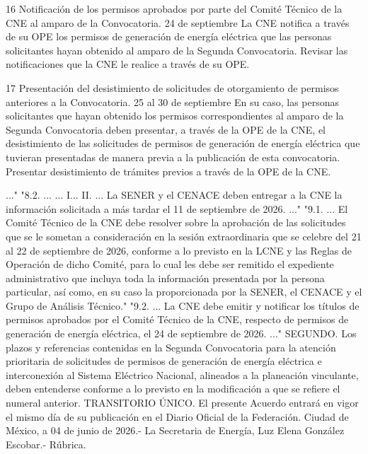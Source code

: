  16
 Notificación de los permisos aprobados por parte del Comité Técnico de la CNE al amparo de la Convocatoria.
 24 de septiembre
 La CNE notifica a través de su OPE los permisos de generación de energía eléctrica que las personas solicitantes hayan obtenido al amparo de la Segunda Convocatoria.
 Revisar las notificaciones que la CNE le realice a través de su OPE.
 
 17
 Presentación del desistimiento de solicitudes de otorgamiento de permisos anteriores a la Convocatoria.
 25 al 30 de septiembre
 En su caso, las personas solicitantes que hayan obtenido los permisos correspondientes al amparo de la Segunda Convocatoria deben presentar, a través de la OPE de la CNE, el desistimiento de las solicitudes de permisos de generación de energía eléctrica que tuvieran presentadas de manera previa a la publicación de esta convocatoria.
 Presentar desistimiento de trámites previos a través de la OPE de la CNE.
 
 
..."
"8.2. ...
...
I...
II. ...
La SENER y el CENACE deben entregar a la CNE la información solicitada a más tardar el 11 de septiembre de 2026.
..."
"9.1. ...
El Comité Técnico de la CNE debe resolver sobre la aprobación de las solicitudes que se le sometan a consideración en la sesión extraordinaria que se celebre del 21 al 22 de septiembre de 2026, conforme a lo previsto en la LCNE y las Reglas de Operación de dicho Comité, para lo cual les debe ser remitido el expediente administrativo que incluya toda la información presentada por la persona particular, así como, en su caso la proporcionada por la SENER, el CENACE y el Grupo de Análisis Técnico."
"9.2. ...
La CNE debe emitir y notificar los títulos de permisos aprobados por el Comité Técnico de la CNE, respecto de permisos de generación de energía eléctrica, el 24 de septiembre de 2026.
..."
SEGUNDO. Los plazos y referencias contenidas en la Segunda Convocatoria para la atención prioritaria de solicitudes de permisos de generación de energía eléctrica e interconexión al Sistema Eléctrico Nacional, alineados a la planeación vinculante, deben entenderse conforme a lo previsto en la modificación a que se refiere el numeral anterior.
TRANSITORIO
ÚNICO. El presente Acuerdo entrará en vigor el mismo día de su publicación en el Diario Oficial  de la Federación.
Ciudad de México, a 04 de junio de 2026.- La Secretaria de Energía, Luz Elena González Escobar.- Rúbrica.\par
\endgroup
